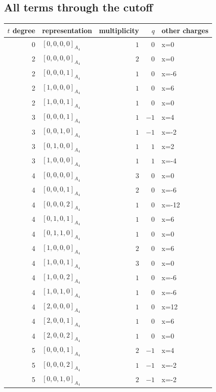 \documentclass[11pt]{article}
\newcommand{\Dynkin}[1]{#1}
\begin{document}
\subsection{All terms through the cutoff}
\begin{longtable}{r l r r l}
\toprule $t$ degree & representation & multiplicity & $q$ & other charges\\\midrule\endhead
0 & $\Dynkin{[0,0,0,0]_{A_4}}$ & $1$ & $0$ & x=0\\
2 & $\Dynkin{[0,0,0,0]_{A_4}}$ & $2$ & $0$ & x=0\\
2 & $\Dynkin{[0,0,0,1]_{A_4}}$ & $1$ & $0$ & x=-6\\
2 & $\Dynkin{[1,0,0,0]_{A_4}}$ & $1$ & $0$ & x=6\\
2 & $\Dynkin{[1,0,0,1]_{A_4}}$ & $1$ & $0$ & x=0\\
3 & $\Dynkin{[0,0,0,1]_{A_4}}$ & $1$ & $-1$ & x=4\\
3 & $\Dynkin{[0,0,1,0]_{A_4}}$ & $1$ & $-1$ & x=-2\\
3 & $\Dynkin{[0,1,0,0]_{A_4}}$ & $1$ & $1$ & x=2\\
3 & $\Dynkin{[1,0,0,0]_{A_4}}$ & $1$ & $1$ & x=-4\\
4 & $\Dynkin{[0,0,0,0]_{A_4}}$ & $3$ & $0$ & x=0\\
4 & $\Dynkin{[0,0,0,1]_{A_4}}$ & $2$ & $0$ & x=-6\\
4 & $\Dynkin{[0,0,0,2]_{A_4}}$ & $1$ & $0$ & x=-12\\
4 & $\Dynkin{[0,1,0,1]_{A_4}}$ & $1$ & $0$ & x=6\\
4 & $\Dynkin{[0,1,1,0]_{A_4}}$ & $1$ & $0$ & x=0\\
4 & $\Dynkin{[1,0,0,0]_{A_4}}$ & $2$ & $0$ & x=6\\
4 & $\Dynkin{[1,0,0,1]_{A_4}}$ & $3$ & $0$ & x=0\\
4 & $\Dynkin{[1,0,0,2]_{A_4}}$ & $1$ & $0$ & x=-6\\
4 & $\Dynkin{[1,0,1,0]_{A_4}}$ & $1$ & $0$ & x=-6\\
4 & $\Dynkin{[2,0,0,0]_{A_4}}$ & $1$ & $0$ & x=12\\
4 & $\Dynkin{[2,0,0,1]_{A_4}}$ & $1$ & $0$ & x=6\\
4 & $\Dynkin{[2,0,0,2]_{A_4}}$ & $1$ & $0$ & x=0\\
5 & $\Dynkin{[0,0,0,1]_{A_4}}$ & $2$ & $-1$ & x=4\\
5 & $\Dynkin{[0,0,0,2]_{A_4}}$ & $1$ & $-1$ & x=-2\\
5 & $\Dynkin{[0,0,1,0]_{A_4}}$ & $2$ & $-1$ & x=-2\\

\end{longtable}
\end{document}
